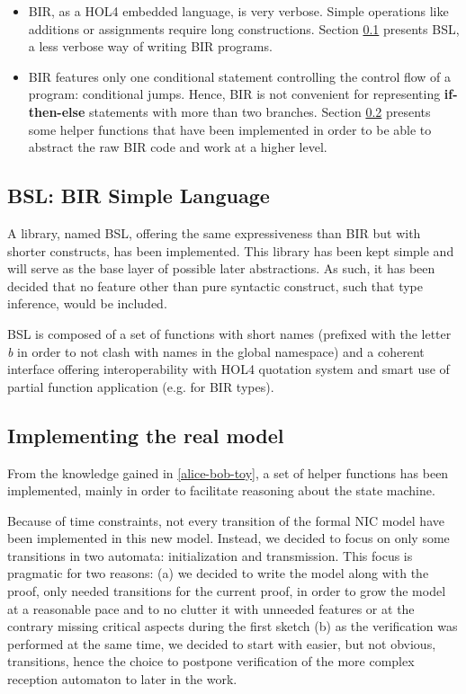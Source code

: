 \documentclass[10pt,a4paper]{article}
\begin{document}
\begin{multicols}{2}
\begin{itemize}
    \item BIR, as a HOL4 embedded language, is very verbose. Simple operations like additions or assignments require long constructions. Section \ref{bsl} presents BSL, a less verbose way of writing BIR programs.
    \item BIR features only one conditional statement controlling the control flow of a program: conditional jumps. Hence, BIR is not convenient for representing \textbf{if-then-else} statements with more than two branches. Section \ref{impl-real-model} presents some helper functions that have been implemented in order to be able to abstract the raw BIR code and work at a higher level.
\end{itemize}

\subsection{BSL: BIR Simple Language} \label{bsl}

A library, named BSL, offering the same expressiveness than BIR but with shorter constructs, has been implemented. This library has been kept simple and will serve as the base layer of possible later abstractions. As such, it has been decided that no feature other than pure syntactic construct, such that type inference, would be included.

BSL is composed of a set of functions with short names (prefixed with the letter \textit{b} in order to not clash with names in the global namespace) and a coherent interface offering interoperability with HOL4 quotation system and smart use of partial function application (e.g. for BIR types).

\subsection{Implementing the real model} \label{impl-real-model}

From the knowledge gained in \ref{alice-bob-toy}, a set of helper functions has been implemented, mainly in order to facilitate reasoning about the state machine.

Because of time constraints, not every transition of the formal NIC model have been implemented in this new model. Instead, we decided to focus on only some transitions in two automata: initialization and transmission. This focus is pragmatic for two reasons: (a) we decided to write the model along with the proof, only needed transitions for the current proof, in order to grow the model at a reasonable pace and to no clutter it with unneeded features or at the contrary missing critical aspects during the first sketch (b) as the verification was performed at the same time, we decided to start with easier, but not obvious, transitions, hence the choice to postpone verification of the more complex reception automaton to later in the work.


\end{multicols}
\end{document}
